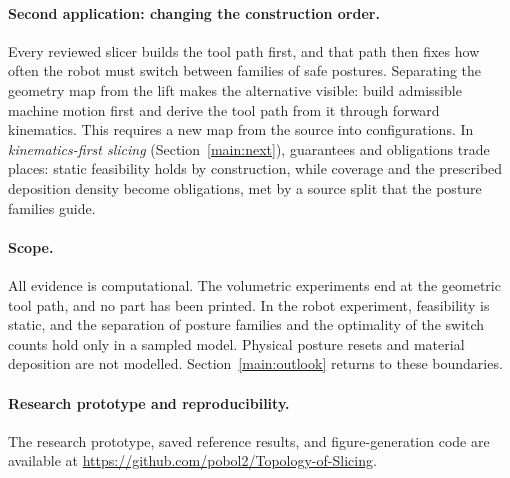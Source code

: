 \paragraph{Second application: changing the construction order.}
Every reviewed slicer builds the tool path first, and that path then fixes how often the robot must switch between families of safe postures. Separating the geometry map from the lift makes the alternative visible: build admissible machine motion first and derive the tool path from it through forward kinematics. This requires a new map from the source into configurations. In \emph{kinematics-first slicing} (Section~\ref{main:next}), guarantees and obligations trade places: static feasibility holds by construction, while coverage and the prescribed deposition density become obligations, met by a source split that the posture families guide.

\paragraph{Scope.}
All evidence is computational. The volumetric experiments end at the geometric tool path, and no part has been printed. In the robot experiment, feasibility is static, and the separation of posture families and the optimality of the switch counts hold only in a sampled model. Physical posture resets and material deposition are not modelled. Section~\ref{main:outlook} returns to these boundaries.

\paragraph{Research prototype and reproducibility.}
The research prototype, saved reference results, and figure-generation code are available at \url{https://github.com/pobol2/Topology-of-Slicing}.
